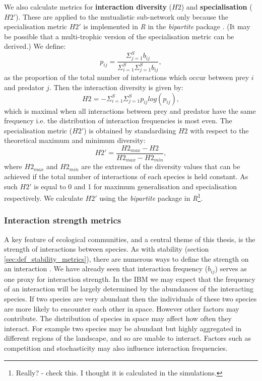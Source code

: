 We also calculate metrics for \textbf{interaction diversity} ($H2$) and \textbf{specialisation} ($H2'$). These are applied to the mutualistic sub-network only because the specialisation metric $H2'$ is implemented in \emph{R} in the \emph{bipartite} package \cite{dormann2008introducing}. (It may be possible that a multi-trophic version of the specialisation metric can be derived.) We define:
\begin{equation}
p_{ij} = \frac{\Sigma_{j=1}^S b_{ij}}{ \Sigma_{i=1}^S \Sigma_{j=1}^S b_{ij}},
\end{equation} 
%
as the proportion of the total number of interactions which occur between prey $i$ and predator $j$. Then the interaction diversity is given by:
\begin{equation}
H2 = - \Sigma_{i=1}^S \Sigma_{j=1}^S p_{ij} log(p_{ij}),
\label{eq:h2}
\end{equation}
%
which is maximal when all interactions between prey and predator have the same frequency i.e. the distribution of interaction frequencies is most even. The specialisation metric ($H2'$) is obtained by standardising $H2$ with respect to the theoretical maximum and minimum diversity:
\begin{equation}
H2' = \frac{H2_{max} - H2}{H2_{max} - H2_{min}},
\label{eq:h2_prime}
\end{equation}
% 
where $H2_{max}$ and $H2_{min}$ are the extremes of the diversity values that can be achieved if the total number of interactions of each species is held constant. As such $H2'$ is equal to 0 and 1 for maximum generalisation and specialisation respectively. We calculate $H2'$ using the \emph{bipartite} package in \emph{R}\footnote{Really? - check this. I thought it is calculated in the simulations.}.


\subsubsection{Interaction strength metrics}
\label{sec:def_iss}
A key feature of ecological communities, and a central theme of this thesis, is the strength of interactions between species. As with stability (section \ref{sec:def_stability_metrics}), there are numerous ways to define the strength on an interaction \cite{berlow2004interaction}. We have already seen that interaction frequency ($b_{ij}$) serves as one proxy for interaction strength. In the IBM we may expect that the frequency of an interaction will be largely determined by the abundances of the interacting species. If two species are very abundant then the individuals of these two species are more likely to encounter each other in space. However other factors may contribute. The distribution of species in space may affect how often they interact. For example two species may be abundant but highly aggregated in different regions of the landscape, and so are unable to interact. Factors such as competition and stochasticity may also influence interaction frequencies.   

